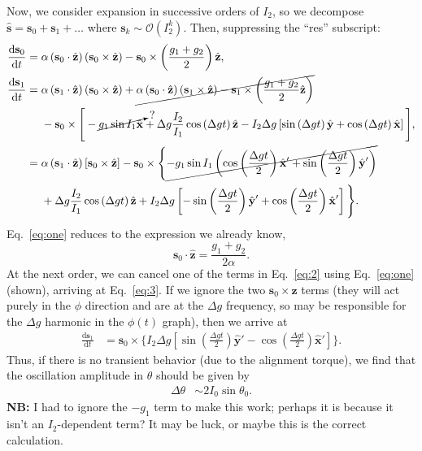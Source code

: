 \documentclass[11pt,
        usenames, %
        dvipsnames %
    ]{article}
\newcommand*{\rd}[2]{\frac{\mathrm{d}#1}{\mathrm{d}#2}}
\newcommand*{\bm}[1]{\boldsymbol{\mathbf{#1}}}
\newcommand*{\uv}[1]{\hat{\bm{#1}}}
\newcommand*{\p}[1]{\left(#1\right)}
\newcommand*{\s}[1]{\left[#1\right]}
\begin{document}
Now, we consider expansion in successive orders of $I_2$, so we decompose
$\uv{s} = \bm{s}_0 + \bm{s}_1 + \dots$ where $\bm{s}_k \sim \mathcal{O}(I_2^k)$.
Then, suppressing the ``res'' subscript:
\begin{align}
    \rd{\bm{s}_0}{t} ={}&
        \alpha\p{\bm{s}_0 \cdot \uv{z}}\p{\bm{s}_0 \times \uv{z}}
        - \bm{s}_0\times \p{\frac{g_1 + g_2}{2}}\uv{z}\label{eq:one},\\
    \rd{\bm{s}_1}{t} ={}&
            \alpha\p{\bm{s}_1 \cdot \uv{z}}\p{\bm{s}_0 \times \uv{z}}
            + \cancel{\alpha\p{\bm{s}_0 \cdot \uv{z}}\p{\bm{s}_1 \times \uv{z}}
            - \bm{s}_1 \times \p{\frac{g_1 + g_2}{2}\uv{z}}}\nonumber\\
        &- \bm{s}_0 \times \Bigg[-\cancelto{?}{g_1 \sin I_1 \uv{x}}
            + \Delta g \frac{I_2}{I_1}\cos\p{\Delta g t}\uv{z}
            - I_2 \Delta g\s{\sin \p{\Delta g t}\uv{y}
                + \cos\p{\Delta g t}\uv{x}}
        \Bigg],\label{eq:2}\\
        ={}&
            \alpha\p{\bm{s}_1 \cdot \uv{z}}\s{\bm{s}_0 \times \uv{z}}
        - \bm{s}_0 \times \Bigg\{\cancel{-g_1 \sin I_1 \p{
            \cos\p{\frac{\Delta g t}{2}}\uv{x}'
            + \sin\p{\frac{\Delta g t}{2}}\uv{y}'}}\nonumber\\
        &+ \Delta g \frac{I_2}{I_1}\cos\p{\Delta g t}\uv{z}
            + I_2 \Delta g\s{-\sin \p{\frac{\Delta g t}{2}}\uv{y}'
                + \cos\p{\frac{\Delta g t}{2}}\uv{x}'}\Bigg\}.\label{eq:3}
\end{align}
Eq.~\eqref{eq:one} reduces to the expression we already know,
\begin{equation}
    \bm{s}_0 \cdot \uv{z} = \frac{g_1 + g_2}{2\alpha}.\label{eq:q_res}
\end{equation}
At the next order, we can cancel one of the terms in Eq.~\eqref{eq:2} using
Eq.~\eqref{eq:one} (shown), arriving at Eq.~\eqref{eq:3}. If we ignore the two
$\bm{s}_0 \times \uv{z}$ terms (they will act purely in the $\phi$ direction and
are at the $\Delta g$ frequency, so may be responsible for the $\Delta g$
harmonic in the $\phi(t)$ graph), then we arrive at
\begin{align}
    \rd{\bm{s}_1}{t} &=
        \bm{s}_0 \times \Bigg\{I_2 \Delta g\s{\sin \p{\frac{\Delta g
            t}{2}}\uv{y}' - \cos\p{\frac{\Delta g t}{2}}\uv{x}'}\Bigg\}.
\end{align}
Thus, if there is no transient behavior (due to the alignment torque), we find
that the oscillation amplitude in $\theta$ should be given by
\begin{align}
    \Delta \theta &\sim 2I_0 \sin \theta_0. \label{eq:dq_amp}
\end{align}
\textbf{NB:} I had to ignore the $-g_1$ term to make this work; perhaps it is
because it isn't an $I_2$-dependent term? It may be luck, or maybe this is the
correct calculation.
\end{document}
